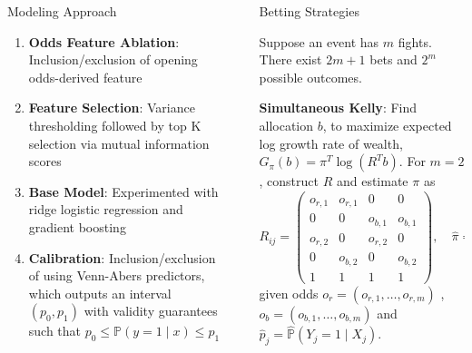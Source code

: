 \documentclass[final]{beamer}
\newlength{\sepwidth}
\newlength{\colwidth}
\newcommand{\separatorcolumn}{\begin{column}{\sepwidth}\end{column}}
\begin{document}
\begin{frame}[t]
\begin{columns}[t]
\begin{column}{\colwidth}
\begin{block}{Modeling Approach}
    \begin{enumerate}
        \item \textbf{Odds Feature Ablation}: Inclusion/exclusion of opening odds-derived feature

        \item \textbf{Feature Selection}: Variance thresholding followed by top K selection via mutual information scores

        \item \textbf{Base Model}: Experimented with ridge logistic regression and gradient boosting

        \item \textbf{Calibration}: Inclusion/exclusion of using Venn-Abers predictors, which outputs an interval $(p_0, p_1)$ with validity guarantees such that
        $p_0 \leq \mathbb{P}(y = 1 \mid x) \leq p_1$
    \end{enumerate}

  \end{block}

\end{column}

\separatorcolumn

\begin{column}{\colwidth}

  \begin{block}{Betting Strategies}

    Suppose an event has $m$ fights. There exist $2m + 1$ bets and $2^m$ possible outcomes.

    \textbf{Simultaneous Kelly}: Find allocation $b$, to maximize expected log growth rate of wealth, $G_{\pi} (b) = \pi^T \log(R^Tb)$. For $m = 2$, construct $R$ and estimate $\pi$ as
    $$R_{ij} = \begin{pmatrix}
    o_{r, 1} & o_{r, 1} & 0 & 0 \\
    0 & 0 & o_{b, 1} & o_{b, 1} \\
    o_{r, 2} & 0 & o_{r, 2} & 0 \\
    0 & o_{b, 2} & 0 & o_{b, 2} \\
    1 & 1 & 1 & 1
    \end{pmatrix}, \quad \hat{\pi} = \begin{pmatrix}
        \hat{p}_1 \hat{p}_2 \\
        \hat{p}_1 (1 - \hat{p}_2) \\
        (1 - \hat{p}_1) \hat{p}_2 \\
        (1 - \hat{p}_1) (1 - \hat{p}_2)
    \end{pmatrix}$$
    given odds $o_{r} = (o_{r,1}, \ldots, o_{r,m})$ , $o_b = (o_{b,1}, \ldots, o_{b,m})$ and $\hat{p}_j = \hat{\mathbb{P}}(Y_j = 1 \mid X_j)$.


\end{block}
\end{column}
\end{columns}
\end{frame}
\end{document}

